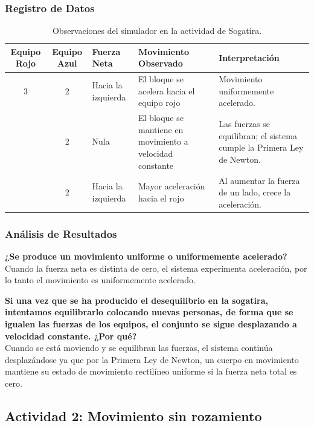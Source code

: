 \documentclass[11pt,a4paper]{article}
\begin{document}
\subsubsection{Registro de Datos}
\begin{table}[H]
\centering
\caption{Observaciones del simulador en la actividad de Sogatira.}
\begin{tabularx}{\textwidth}{@{} c c p{2.5cm} p{3.5cm} X @{}}
\toprule
\textbf{Equipo Rojo} & \textbf{Equipo Azul} & \textbf{Fuerza Neta} & \textbf{Movimiento Observado} & \textbf{Interpretación} \\ \midrule
3 & 2 & Hacia la izquierda & El bloque se acelera hacia el equipo rojo & Movimiento uniformemente acelerado. \\ \addlinespace
2 & 2 & Nula & El bloque se mantiene en movimiento a velocidad constante & Las fuerzas se equilibran; el sistema cumple la Primera Ley de Newton. \\ \addlinespace
4 & 2 & Hacia la izquierda & Mayor aceleración hacia el rojo & Al aumentar la fuerza de un lado, crece la aceleración. \\ \bottomrule
\end{tabularx}
\end{table}

\subsubsection{Análisis de Resultados}
\textbf{¿Se produce un movimiento uniforme o uniformemente acelerado?} \\
Cuando la fuerza neta es distinta de cero, el sistema experimenta aceleración, por lo tanto el movimiento es uniformemente acelerado.

\noindent \textbf{Si una vez que se ha producido el desequilibrio en la sogatira, intentamos equilibrarlo colocando nuevas personas, de forma que se igualen las fuerzas de los equipos, el conjunto se sigue desplazando a velocidad constante. ¿Por qué?} \\
Cuando se está moviendo y se equilibran las fuerzas, el sistema continúa desplazándose ya que por la Primera Ley de Newton, un cuerpo en movimiento mantiene su estado de movimiento rectilíneo uniforme si la fuerza neta total es cero.

\subsection{Actividad 2: Movimiento sin rozamiento}
\end{document}
